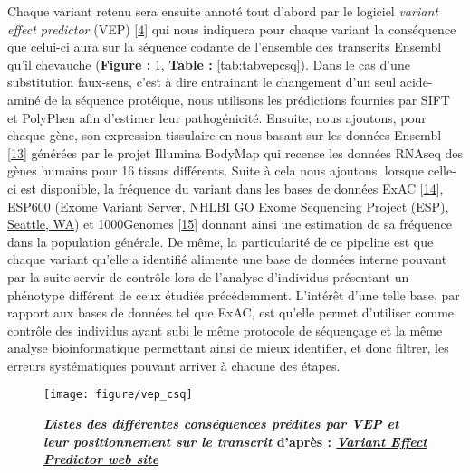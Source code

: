\documentclass[12pt,twoside]{ugathesis}
\begin{document}
Chaque variant retenu sera ensuite annoté tout d'abord par le logiciel
\emph{variant effect predictor} (VEP)
{[}\protect\hyperlink{ref-McLaren2016}{4}{]} qui nous indiquera pour
chaque variant la conséquence que celui-ci aura sur la séquence codante
de l'ensemble des transcrits Ensembl qu'il chevauche (\textbf{Figure :
}\ref{fig:pictvepcsq}, \textbf{Table : }\ref{tab:tabvepcsq}). Dans le
cas d'une substitution faux-sens, c'est à dire entrainant le changement
d'un seul acide-aminé de la séquence protéique, nous utilisons les
prédictions fournies par SIFT et PolyPhen afin d'estimer leur
pathogénicité. Ensuite, nous ajoutons, pour chaque gène, son expression
tissulaire en nous basant sur les données Ensembl
{[}\protect\hyperlink{ref-Aken2017}{13}{]} générées par le projet
Illumina BodyMap qui recense les données RNAseq des gènes humains pour
16 tissus différents. Suite à cela nous ajoutons, lorsque celle-ci est
disponible, la fréquence du variant dans les bases de données ExAC
{[}\protect\hyperlink{ref-Lek2016}{14}{]}, ESP600
(\href{http://evs.gs.washington.edu/EVS/}{Exome Variant Server, NHLBI GO
Exome Sequencing Project (ESP), Seattle, WA}) et 1000Genomes
{[}\protect\hyperlink{ref-1000GenomesProjectConsortium2015}{15}{]}
donnant ainsi une estimation de sa fréquence dans la population
générale. De même, la particularité de ce pipeline est que chaque
variant qu'elle a identifié alimente une base de données interne pouvant
par la suite servir de contrôle lors de l'analyse d'individus présentant
un phénotype différent de ceux étudiés précédemment. L'intérêt d'une
telle base, par rapport aux bases de données tel que ExAC, est qu'elle
permet d'utiliser comme contrôle des individus ayant subi le même
protocole de séquençage et la même analyse bioinformatique permettant
ainsi de mieux identifier, et donc filtrer, les erreurs systématiques
pouvant arriver à chacune des étapes.

\begin{figure}

{\centering \texttt{[image: figure/vep\_csq]} 

}

\caption[Listes des différentes conséquences prédites par VEP et leur positionnement sur le transcrit]{\textbf{\emph{Listes des différentes conséquences
prédites par VEP et leur positionnement sur le transcrit} d'après :
\href{http://www.ensembl.org/info/genome/variation/consequences.jpg}{\emph{Variant
Effect Predictor web site}}}}\label{fig:pictvepcsq}
\end{figure}
\end{document}
